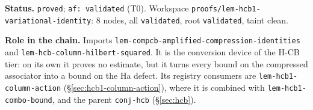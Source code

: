 \medskip
\noindent\textbf{Status.} \texttt{proved}; \texttt{af: validated} (T0). Workspace
\texttt{proofs/lem-hcb1-variational-identity}: 8 nodes, all \texttt{validated}, root
\texttt{validated}, taint clean.

\noindent\textbf{Role in the chain.} Imports
\texttt{lem-compcb-amplified-compression-identities} and
\texttt{lem-hcb-column-hilbert-squared}. It is the conversion device of the H-CB tier: on
its own it proves no estimate, but it turns every bound on the compressed associator into
a bound on the Ha defect. Its registry consumers are \texttt{lem-hcb1-column-action}
(\S\ref{sec:hcb1-column-action}), where it is combined with
\texttt{lem-hcb1-combo-bound}, and the parent \texttt{conj-hcb}
(\S\ref{sec:hcb}).
